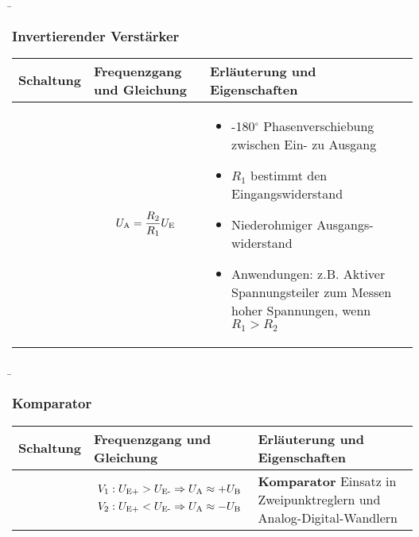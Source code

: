 \begin{frame}
    \b{
    \frametitle{Invertierender Verstärker}
    \centering
    \begin{table}[ht]
    \label{tab:InvertierenderVerstaerker}
    \begin{tabular}{|m{}|m{}|m{}|}
    \hline
    Schaltung & Frequenzgang und Gleichung & Erläuterung und Eigenschaften\\ %
    \hline
    \vspace{0.5cm}
    \centering
    
     & 
    \begin{center}
        
\end{center}
\vspace{1ex}
\[
    U_{\textnormal{A}} = \frac{R_2}{R_1} U_{\textnormal{E}}
\]
    &
\begin{itemize}
    \item -180$^\circ$ Phasenverschiebung zwischen Ein- zu Ausgang
    \item $R_1$ bestimmt den Eingangswiderstand
    \item Niederohmiger Ausgangs-\linebreak widerstand
    \item Anwendungen: \linebreak z.B. Aktiver Spannungsteiler zum Messen hoher Spannungen, wenn $R_1 > R_2$
\end{itemize} \\
    \hline
    \end{tabular}
    \end{table}
    }
\end{frame}

\begin{frame}
    \b{
    \frametitle{Komparator}
    \centering
    \begin{table}[ht]
    \label{tab:Komparator}
    \begin{tabular}{|m{}|m{}|m{}|}
    \hline
    Schaltung & Frequenzgang und Gleichung & Erläuterung und Eigenschaften\\ %
    \hline
    \vspace{0.5cm}
    \centering
    
    & 
    \begin{center}
               
\[
V_1: U_{\textnormal{E+}} > U_{\textnormal{E-}} \Rightarrow U_{\textnormal{A}} \approx +U_{\textnormal{B}}
\]
\[
V_2: U_{\textnormal{E+}} < U_{\textnormal{E-}} \Rightarrow U_{\textnormal{A}} \approx -U_{\textnormal{B}}
\]
\end{center}
    &\textbf{Komparator}\newline
    Einsatz in Zweipunktreglern und Analog-Digital-Wandlern \\
    \hline
    \end{tabular}
    \end{table}
    }
\end{frame}

